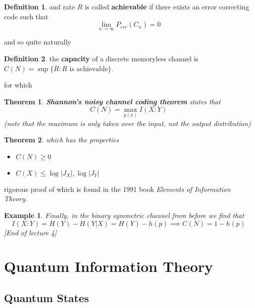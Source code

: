 \documentclass{article}
\newtheorem{example}{Example}
\newtheorem{theorem}{Theorem}
\theoremstyle{definition}
\newtheorem{definition}{Definition}
\begin{document}
\begin{definition}
  and rate $R$ is called \textbf{achievable} if there exists an error correcting
  code such that
  \begin{equation}
    \lim_{n \to \infty} P_{err}(C_n) = 0
  \end{equation}
\end{definition}

and so quite naturally

\begin{definition}
the \textbf{capacity} of a discrete memoryless channel is $C(N) = \sup \{R : R
\text{ is achievable}\}$.
\end{definition}

for which

\begin{theorem}
\textbf{Shannon's noisy channel coding theorem} states that
\begin{equation}
C(N) = \max_{p(x)} I(X : Y)
\end{equation}
(note that the maximum is only taken over the input, not the output
distribution)
\end{theorem}

\begin{theorem}
which has the properties
\begin{itemize}
\item $C(N) \geq 0$
\item $C(X) \leq \log |J_X|, \log |J_Y|$
\end{itemize}
\end{theorem}

rigorous proof of which is found in the 1991 book \textit{Elements of
  Information Theory}.

\begin{example}
Finally, in the binary symmetric channel from before we find that
\begin{equation}
I(X : Y) = H(Y) - H(Y | X) = H(Y) - h(p) \implies C(N) = 1 - h(p)
\end{equation}
[End of lecture 4]
\end{example}

\section{Quantum Information Theory}

\subsection{Quantum States}
\end{document}
